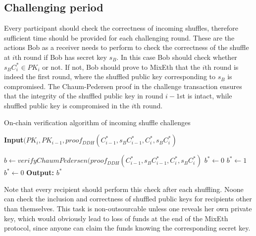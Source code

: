 \documentclass[a4paper]{article}
\theoremstyle{definition}
\begin{document}
\subsection{Challenging period}
Every participant should check the correctness of incoming shuffles, therefore sufficient time should be provided for each challenging round. These are the actions Bob as a receiver needs to perform to check the correctness of the shuffle at $i$th round if Bob has secret key $s_{B}$. In this case Bob should check whether $s_{B}C^{*}_{i} \in PK_{i}$ or not. If not, Bob should prove to MixEth that the $i$th round is indeed the first round, where the shuffled public key corresponding to $s_{B}$ is compromised. The Chaum-Pedersen proof in the challenge transaction ensures that the integrity of the shuffled public key in round $i-1$st is intact, while shuffled public key is compromised in the $i$th round.   

\begin{algorithm}
	\caption{On-chain verification algorithm of incoming shuffle challenges}\label{verifyingshufflingoffchain}
	\hspace*{\algorithmicindent} \textbf{Input}$(PK_{i}, PK_{i-1}, proof_{DDH}(C^{*}_{i-1},s_{B}C^{*}_{i-1},C^{*}_{i},s_{B}C^{*}_{i})$ \\
	\begin{algorithmic}[1]
		\State $b\leftarrow verifyChaumPedersen(proof_{DDH}(C^{*}_{i-1},s_{B}C^{*}_{i-1}, C^{*}_{i},s_{B}C^{*}_{i})$ 
		\State $b^*\leftarrow0$
		\State $b^*\gets 1$
		\Else
		\State $b^*\gets 0$
		\EndIf
		\hspace*{\algorithmicindent} \textbf{Output:} $b^{*}$ 
	\end{algorithmic}   
\end{algorithm}
Note that every recipient should perform this check after each shuffling. Noone can check the inclusion and correctness of shuffled public keys for recipients other than themselves. This task is non-outsourcable unless one reveals her own private key, which would obviously lead to loss of funds at the end of the MixEth protocol, since anyone can claim the funds knowing the corresponding secret key. 
\end{document}
